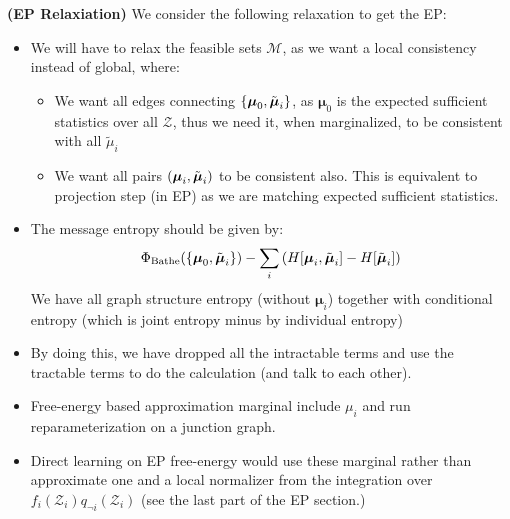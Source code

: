 \begin{remark}{\textbf{(EP Relaxiation)}}
    We consider the following relaxation to get the EP:
    \begin{itemize}
        \item We will have to relax the feasible sets $\mathcal{M}$, as we want a local consistency instead of global, where:
        \begin{itemize}
            \item We want all edges connecting $\left\{ \boldsymbol \mu_0, \tilde{\boldsymbol \mu}_i \right\}$, as $\boldsymbol \mu_0$ is the expected sufficient statistics over all $\mathcal{Z}$, thus we need it, when marginalized, to be consistent with all $\tilde{\mu}_i$
            \item We want all pairs $\left( \boldsymbol \mu_i, \tilde{\boldsymbol \mu}_i \right)$ to be consistent also. This is equivalent to projection step (in EP) as we are matching expected sufficient statistics. 
        \end{itemize}
        \item The message entropy should be given by:
        \begin{equation*}
            \Phi_\text{Bathe}(\left\{ \boldsymbol \mu_0, \tilde{\boldsymbol \mu}_i \right\}) - \sum_i\left( H[\boldsymbol \mu_i, \tilde{\boldsymbol \mu}_i] - H[\tilde{\boldsymbol \mu}_i] \right)
        \end{equation*}
        We have all graph structure entropy (without $\boldsymbol \mu_i$) together with conditional entropy (which is joint entropy minus by individual entropy)
        \item By doing this, we have dropped all the intractable terms and use the tractable terms to do the calculation (and talk to each other).  
        \item Free-energy based approximation marginal include $\mu_i$ and run reparameterization on a junction graph. 
        \item Direct learning on EP free-energy would use these marginal rather than approximate one and a local normalizer from the integration over $f_i(\mathcal{Z}_i)q_{\neg i}(\mathcal{Z}_i)$ (see the last part of the EP section.)
    \end{itemize}
\end{remark}


